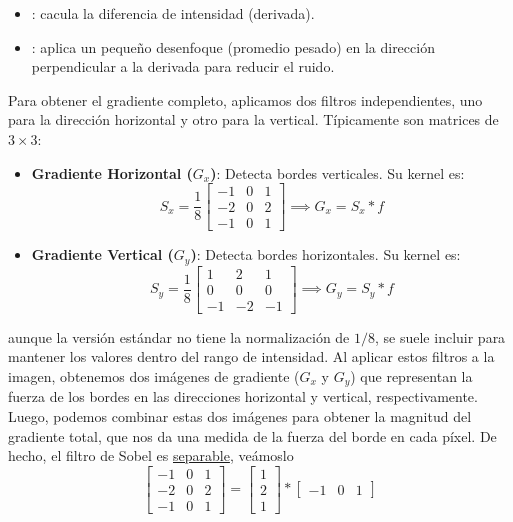 \begin{itemize}
    \item {}: cacula la diferencia de intensidad (derivada).
    \item {}: aplica un pequeño desenfoque (promedio pesado) en la dirección perpendicular a la derivada para reducir el ruido.
\end{itemize}
Para obtener el gradiente completo, aplicamos dos filtros independientes, uno para la dirección horizontal y otro para la vertical. Típicamente son matrices de $3 \times 3$:
\begin{itemize}
    \item \textbf{Gradiente Horizontal ($G_x$)}: Detecta bordes verticales. Su kernel es:
$$S_x = \dfrac{1}{8}\begin{bmatrix} -1 & 0 & 1 \\ -2 & 0 & 2 \\ -1 & 0 & 1 \end{bmatrix} \implies G_x=S_x\ast f $$
    \item \textbf{Gradiente Vertical ($G_y$)}: Detecta bordes horizontales. Su kernel es:
$$S_y = \dfrac{1}{8}\begin{bmatrix} 1 & 2 & 1 \\ 0 & 0 & 0 \\ -1 & -2 & -1 \end{bmatrix} \implies G_y=S_y\ast f$$
\end{itemize}
aunque la versión estándar no tiene la normalización de $1/8$, se suele incluir para mantener los valores dentro del rango de intensidad. Al aplicar estos filtros a la imagen, obtenemos dos imágenes de gradiente ($G_x$ y $G_y$) que representan la fuerza de los bordes en las direcciones horizontal y vertical, respectivamente. Luego, podemos combinar estas dos imágenes para obtener la magnitud del gradiente total, que nos da una medida de la fuerza del borde en cada píxel. De hecho, el filtro de Sobel es \underline{separable}, veámoslo
$$\begin{bmatrix} -1 & 0 & 1 \\ -2 & 0 & 2 \\ -1 & 0 & 1 \end{bmatrix} = \begin{bmatrix} 1 \\ 2 \\ 1 \end{bmatrix} * \begin{bmatrix} -1 & 0 & 1 \end{bmatrix}$$

